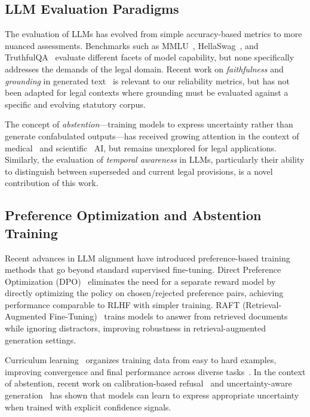 \documentclass[11pt,a4paper]{article}
\begin{document}
\subsection{LLM Evaluation Paradigms}

The evaluation of LLMs has evolved from simple accuracy-based metrics to more nuanced assessments.
Benchmarks such as MMLU~\citep{hendrycks2021mmlu}, HellaSwag~\citep{zellers2019hellaswag}, and TruthfulQA~\citep{lin2022truthfulqa} evaluate different facets of model capability, but none specifically addresses the demands of the legal domain.
Recent work on \emph{faithfulness} and \emph{grounding} in generated text~\citep{maynez2022faithfulness,chen2023benchmarking} is relevant to our reliability metrics, but has not been adapted for legal contexts where grounding must be evaluated against a specific and evolving statutory corpus.

The concept of \emph{abstention}---training models to express uncertainty rather than generate confabulated outputs---has received growing attention in the context of medical~\citep{singhal2023towards} and scientific~\citep{taylor2022galactica} AI, but remains unexplored for legal applications.
Similarly, the evaluation of \emph{temporal awareness} in LLMs, particularly their ability to distinguish between superseded and current legal provisions, is a novel contribution of this work.

\subsection{Preference Optimization and Abstention Training}

Recent advances in LLM alignment have introduced preference-based training methods that go beyond standard supervised fine-tuning.
Direct Preference Optimization (DPO)~\citep{rafailov2023dpo} eliminates the need for a separate reward model by directly optimizing the policy on chosen/rejected preference pairs, achieving performance comparable to RLHF with simpler training.
RAFT (Retrieval-Augmented Fine-Tuning)~\citep{zhang2024raft} trains models to answer from retrieved documents while ignoring distractors, improving robustness in retrieval-augmented generation settings.

Curriculum learning~\citep{bengio2009curriculum} organizes training data from easy to hard examples, improving convergence and final performance across diverse tasks~\citep{svirske2024curriculum}.
In the context of abstention, recent work on calibration-based refusal~\citep{kamath2020selective} and uncertainty-aware generation~\citep{lin2022truthfulqa} has shown that models can learn to express appropriate uncertainty when trained with explicit confidence signals.
\end{document}
